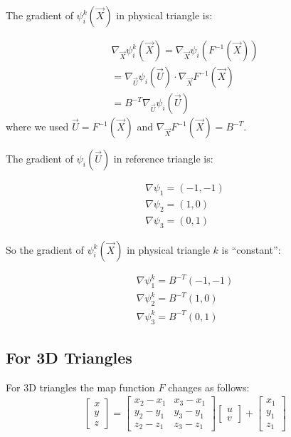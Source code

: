 \documentclass{birkjour}
\numberwithin{equation}{section}
\begin{document}
The gradient of $\psi^k_i(\vec X)$ in physical triangle is:

\begin{eqnarray} 
	\nabla_{\vec X} \psi^k_i(\vec X) = \nabla_{\vec X} \psi_i( F^{-1}(\vec X) ) \nonumber\\
    = \nabla_{\vec U} \psi_i( \vec U ) \cdot \nabla_{\vec X} F^{-1}(\vec X) \nonumber\\
    = B^{-T} \nabla_{\vec U} \psi_i( \vec U) \nonumber
\end{eqnarray}
where we used $\vec U = F^{-1}(\vec X)$ and $\nabla_{\vec X} F^{-1}(\vec X) = B^{-T}$.

The gradient of $\psi_i(\vec U)$ in reference triangle is:

\begin{eqnarray} 
	\nabla \psi_1 = (-1, -1) \nonumber\\
	\nabla \psi_2 = (1, 0) \nonumber\\
	\nabla \psi_3 = (0, 1) \nonumber
\end{eqnarray}

So the gradient of $\psi^k_i(\vec X)$ in physical triangle $k$ is ``constant'':
 
\begin{eqnarray} 
	\nabla \psi^k_1 = B^{-T} (-1, -1) \nonumber\\
	\nabla \psi^k_2 = B^{-T} (1, 0) \nonumber\\
	\nabla \psi^k_3 = B^{-T} (0, 1) \nonumber
\end{eqnarray}

\subsection{For 3D Triangles}

For 3D triangles the map function $F$ changes as follows:
\begin{eqnarray}
	\left[\begin{array}{c}
		x \\
		y \\
		z
	\end{array}\right] = 
	\left[\begin{array}{cc}
		x_2 - x_1 &  x_3 - x_1 \\
		y_2 - y_1 &  y_3 - y_1 \\
		z_2 - z_1 &  z_3 - z_1
	\end{array}\right] 
	\left[\begin{array}{c}
		u \\
		v
	\end{array}\right] +
	\left[\begin{array}{c}
		x_1 \\
		y_1 \\
		z_1
	\end{array}\right] \nonumber
\end{eqnarray}
\end{document}
